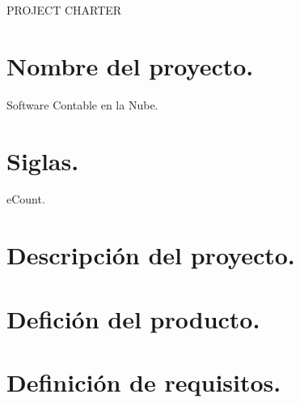 \begin{center}
	\huge{PROJECT CHARTER}
\end{center}

\chapter*{Nombre del proyecto.}
%
Software Contable en la Nube.%

\chapter*{Siglas.}
%
eCount.%

\chapter*{Descripci\'on del proyecto.}

\chapter*{Defici\'on del producto.}

\chapter*{Definici\'on de requisitos.}